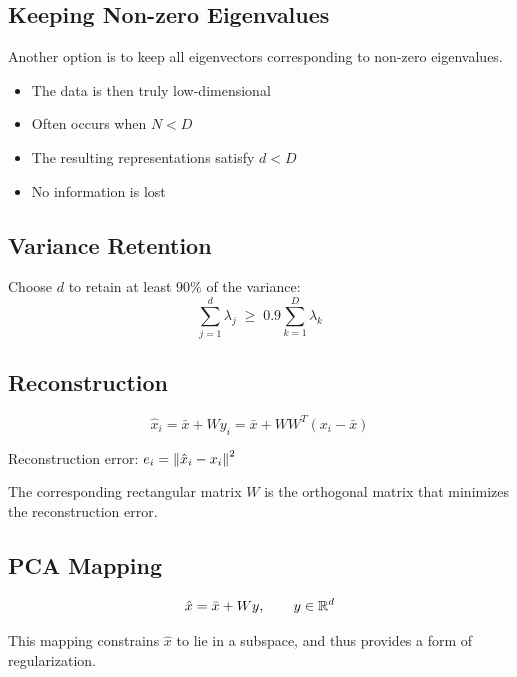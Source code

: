 \documentclass[11pt,a4paper,openany]{book}
\begin{document}
\subsection{Keeping Non-zero Eigenvalues}

\begin{rembox}[title=Intrinsic low dimensionality]
Another option is to keep all eigenvectors corresponding to non-zero eigenvalues.

\begin{itemize}
    \item The data is then truly low-dimensional
    \item Often occurs when \(N < D\)
    \item The resulting representations satisfy \(d < D\)
    \item No information is lost
\end{itemize}
\end{rembox}

\subsection{Variance Retention}

Choose \(d\) to retain at least \(90\%\) of the variance:
\[
\sum_{j=1}^{d} \lambda_j \;\ge\; 0.9\sum_{k=1}^{D} \lambda_k
\]

\subsection{Reconstruction}

\[
\hat{x}_i = \bar{x} + Wy_i = \bar{x} + WW^T(x_i-\bar{x})
\]

Reconstruction error: \(e_i = \left\lVert \hat{x}_i - x_i \right\rVert^2\)

\begin{propbox}[title=PCA minimizes reconstruction error]
The corresponding rectangular matrix \(W\) is the orthogonal matrix that minimizes the reconstruction error.
\end{propbox}

\subsection{PCA Mapping}

\[
\hat{x} = \bar{x} + Wy, \qquad y \in \mathbb{R}^d
\]

This mapping constrains \(\hat{x}\) to lie in a subspace, and thus provides a form of regularization.

\end{document}
